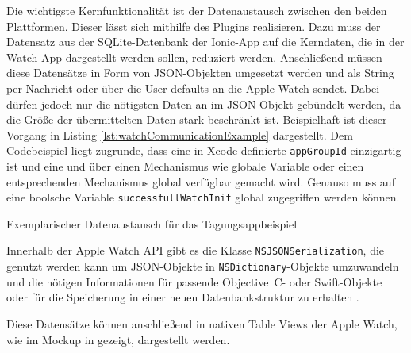 Die wichtigste Kernfunktionalität ist der Datenaustausch zwischen den beiden Plattformen.
Dieser lässt sich mithilfe des Plugins realisieren. Dazu muss der Datensatz aus der SQLite-Datenbank der Ionic-App auf die Kerndaten, die in der Watch-App dargestellt werden sollen, reduziert werden. Anschließend müssen diese Datensätze in Form von JSON-Objekten umgesetzt werden und als String per Nachricht oder über die User defaults an die Apple Watch sendet. Dabei dürfen jedoch nur die nötigsten Daten an im JSON-Objekt gebündelt werden, da die Größe der übermittelten Daten stark beschränkt ist. Beispielhaft ist dieser Vorgang in Listing \ref{lst:watchCommunicationExample} dargestellt. Dem Codebeispiel liegt zugrunde, dass eine in Xcode definierte \texttt{appGroupId} einzigartig ist und eine und über einen Mechanismus wie globale Variable oder einen entsprechenden Mechanismus global verfügbar gemacht wird. Genauso muss auf eine boolsche Variable \texttt{successfullWatchInit} global zugegriffen werden können. 

\begin{listing}[htb]
    
    \caption{Exemplarischer Datenaustausch für das Tagungsappbeispiel}
    \label{lst:watchCommunicationExample}
\end{listing}

Innerhalb der Apple Watch API gibt es die Klasse \texttt{NSJSONSerialization}, die genutzt werden kann um JSON-Objekte in \texttt{NSDictionary}-Objekte umzuwandeln und die nötigen Informationen für passende Objective~C- oder Swift-Objekte oder für die Speicherung in einer neuen Datenbankstruktur zu erhalten \cite{appleDokuJSONSerialization}. 

Diese Datensätze können anschließend in nativen Table Views der Apple Watch, wie im Mockup in  gezeigt, dargestellt werden.

